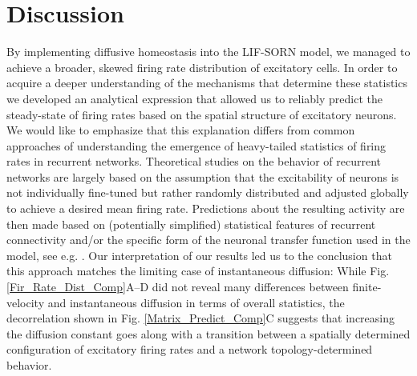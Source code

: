 \documentclass[10pt,letterpaper]{article}
\begin{document}
\section*{Discussion}
By implementing diffusive homeostasis into the LIF-SORN model, we managed to achieve a broader, skewed firing rate distribution of excitatory cells. In order to acquire a deeper understanding of the mechanisms that determine these statistics we developed an analytical expression that allowed us to reliably predict the steady-state of firing rates based on the spatial structure of excitatory neurons. We would like to emphasize that this explanation differs from common approaches of understanding the emergence of heavy-tailed statistics of firing rates in recurrent networks. Theoretical studies on the behavior of recurrent networks are largely based on the assumption that the excitability of neurons is not individually fine-tuned but rather randomly distributed and adjusted globally to achieve a desired mean firing rate. Predictions about the resulting activity are then made based on (potentially simplified) statistical features of recurrent connectivity and/or the specific form of the neuronal transfer function used in the model, see e.g. \cite{Roxin_Firing_Rate_Distribution,Vreeswijk1998,Koulakov_2009}. Our interpretation of our results led us to the conclusion that this approach matches the limiting case of instantaneous diffusion: While Fig. \ref{Fir_Rate_Dist_Comp}A--D did not reveal many differences between finite-velocity and instantaneous diffusion in terms of overall statistics, the decorrelation shown in Fig. \ref{Matrix_Predict_Comp}C suggests that increasing the diffusion constant goes along with a transition between a spatially determined configuration of excitatory firing rates and a network topology-determined behavior.
\end{document}

